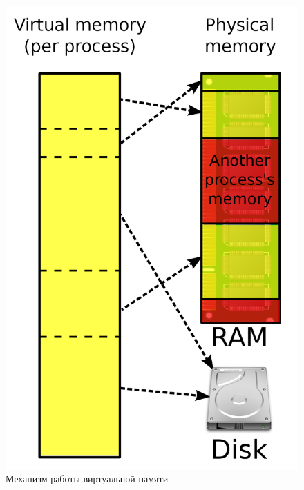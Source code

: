 \documentclass[a4paper,12pt]{extarticle}
\begin{document}
	\begin{figure}
		\centering
		\vspace{-10pt}
		
			\includegraphics[width=\linewidth]{../diagrams/virt-mem}
			\caption{Механизм работы виртуальной памяти}
		
		\label{fig:virt-mem}
		\vspace{-15pt}
	\end{figure}
\end{document}
